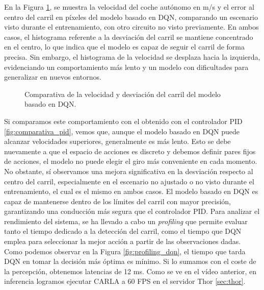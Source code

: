 \newpage

En la Figura \ref{fig:comparativa_dqn}, se muestra la velocidad del coche autónomo en m/s y el error al centro del carril en píxeles del modelo basado en \ac{DQN}, comparando un escenario visto durante el entrenamiento\footnotemark[4], con otro circuito no visto previamente. En ambos casos, el histograma referente a la desviación del carril se mantiene concentrado en el centro, lo que indica que el modelo es capaz de seguir el carril de forma precisa. Sin embargo, el histograma de la velocidad se desplaza hacia la izquierda, evidenciando un comportamiento más lento y un modelo con dificultades para generalizar en nuevos entornos.
\begin{figure}[ht]
\centering
{}
\hfill
{}
\caption{Comparativa de la velocidad y desviación del carril del modelo basado en \ac{DQN}.}
\label{fig:comparativa_dqn}
\end{figure}

Si comparamos este comportamiento con el obtenido con el controlador \ac{PID} \ref{fig:comparativa_pid}, vemos que, aunque el modelo basado en \ac{DQN} puede alcanzar velocidades superiores, generalmente es más lento. Esto se debe nuevamente a que el espacio de acciones es discreto y debemos definir pares fijos de acciones, el modelo no puede elegir el giro más conveniente en cada momento. No obstante, sí observamos una mejora significativa en la desviación respecto al centro del carril, especialmente en el escenario no ajustado o no visto durante el entrenamiento, el cual es el mismo en ambos casos. El modelo basado en \ac{DQN} es capaz de mantenerse dentro de los límites del carril con mayor precisión, garantizando una conducción más segura que el controlador \ac{PID}.
Para analizar el rendimiento del sistema, se ha llevado a cabo un \textit{profiling} que permite evaluar tanto el tiempo dedicado a la detección del carril, como el tiempo que \ac{DQN} emplea para seleccionar la mejor acción a partir de las observaciones dadas. Como podemos observar en la Figura \ref{fig:profiling_dqn}, el tiempo que tarda \ac{DQN} en tomar la decisión más óptima es mínimo. Si lo sumamos con el coste de la percepción, obtenemos latencias de 12 ms. Como se ve en el vídeo anterior\footnotemark[4], en inferencia logramos ejecutar CARLA a 60 \ac{FPS} en el servidor Thor \ref{sec:thor}.


